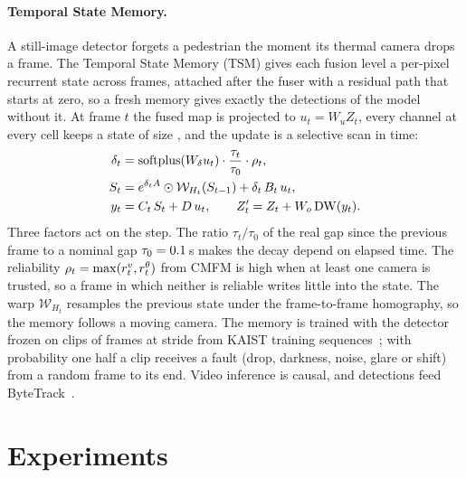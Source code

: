 \paragraph{Temporal State Memory.}
\label{sec:tsm}
A still-image detector forgets a pedestrian the moment its thermal camera drops a frame. The Temporal State Memory (TSM) gives each fusion level a per-pixel recurrent state across frames, attached after the fuser with a residual path that starts at zero, so a fresh memory gives exactly the detections of the model without it. At frame $t$ the fused map is projected to $u_t=W_u Z_t$, every channel at every cell keeps a state of size \cfgMemState{}, and the update is a selective scan in time:
\begin{align}
\delta_t &= \operatorname{softplus}(W_\delta u_t)\cdot\frac{\tau_t}{\tau_0}\cdot\rho_t,\\
S_t &= e^{\delta_t A}\odot \mathcal{W}_{H_t}(S_{t-1}) + \delta_t\, B_t\, u_t,\\
y_t &= C_t\, S_t + D\, u_t,\qquad Z'_t = Z_t + W_o\,\mathrm{DW}(y_t).
\end{align}
Three factors act on the step. The ratio $\tau_t/\tau_0$ of the real gap since the previous frame to a nominal gap $\tau_0=0.1{}$\,s makes the decay depend on elapsed time. The reliability $\rho_t=\max(r^{v}_t,r^{\theta}_t)$ from CMFM is high when at least one camera is trusted, so a frame in which neither is reliable writes little into the state. The warp $\mathcal{W}_{H_t}$ resamples the previous state under the frame-to-frame homography, so the memory follows a moving camera. The memory is trained with the detector frozen on clips of \cfgClipLen{} frames at stride \cfgClipStride{} from KAIST training sequences~\cite{hwang2015kaist}; with probability one half a clip receives a fault (drop, darkness, noise, glare or shift) from a random frame to its end. Video inference is causal, and detections feed ByteTrack~\cite{zhang2022bytetrack}.

\section{Experiments}
\label{sec:experiments}

